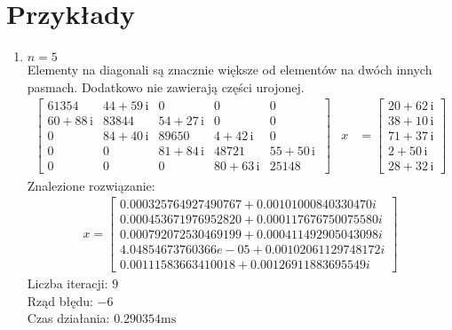 \documentclass[12pt]{article}
\begin{document}
	\section{Przykłady}
	\begin{enumerate}[label=\textbf{Układ \arabic*}]
		\item
			$n = 5$ \\
			Elementy na diagonali są znacznie większe od elementów na dwóch innych pasmach. Dodatkowo nie zawierają części urojonej.
			\begin{align*}
				\left[
					\begin{array}{ccccc} 61354 & 44 + 59\, \mathrm{i} & 0 & 0 & 0\\ 60 + 88\, \mathrm{i} & 83844 & 54 + 27\, \mathrm{i} & 0 & 0\\ 0 & 84 + 40\, \mathrm{i} & 89650 & 4 + 42\, \mathrm{i} & 0\\ 0 & 0 & 81 + 84\, \mathrm{i} & 48721 & 55 + 50\, \mathrm{i}\\ 0 & 0 & 0 & 80 + 63\, \mathrm{i} & 25148 \end{array}\
				\right]
				&x
				&= 
				\left[
					\begin{array}{c} 20 + 62\, \mathrm{i}\\ 38 + 10\, \mathrm{i}\\ 71 + 37\, \mathrm{i}\\ 2 + 50\, \mathrm{i}\\ 28 + 32\, \mathrm{i} \end{array}
				\right]	
			\end{align*}
			Znalezione rozwiązanie:
			\begin{align*}
			x = 
				\left[
					\begin{array}{c}
					0.000325764927490767 + 0.00101000840330470i\\
					0.000453671976952820 + 0.000117676750075580i\\
					0.000792072530469199 + 0.000411492905043098i\\
					4.04854673760366e-05 + 0.00102061129748172i\\
					0.00111583663410018 + 0.00126911883695549i
					\end{array}
				\right]
			\end{align*}
			Liczba iteracji: $9$\\
			Rząd błędu: $-6$\\
			Czas działania: $0.290354\text{ms}$
		

\end{enumerate}
\end{document}

